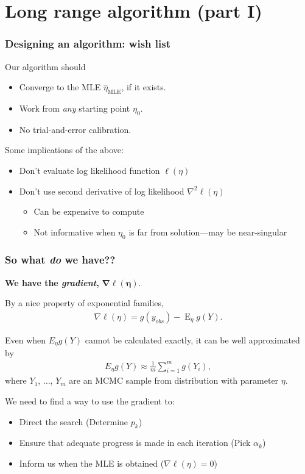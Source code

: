 \documentclass[slidestop,compress, 10pt]{beamer}
\DeclareMathOperator{\E}{E}
\newcommand{\etaMLE}{\hat{\eta}_{\textrm{MLE}}}
\begin{document}
\section{Long range algorithm (part I)}
\frame
{
\frametitle{Designing an algorithm: wish list}

Our algorithm should
\begin{itemize}
\item Converge to the MLE $\etaMLE$, if it exists.
\item Work from \emph{any} starting point $\eta_0$.
\item No trial-and-error calibration.
\end{itemize}
\vspace{2mm}

Some implications of the above:
\begin{itemize}
\item Don't evaluate log likelihood function $\ell( \eta)$
\item Don't use second derivative of log likelihood $\nabla^2 \ell( \eta)$
\begin{itemize}
	\item Can be expensive to compute
	\item Not informative when $\eta_0$ is far from solution---may be near-singular
\end{itemize}
\end{itemize}
}

\frame
{
\frametitle{So what \emph{do} we have??}
{\textbf{We have the \emph{gradient},} $\boldsymbol{\nabla \ell(\eta)}$.}
\vspace*{2mm}

By a nice property of exponential families,
\begin{align*}
	\nabla \ell( \eta ) = g(y_{obs}) - \E_{\eta} g(Y).
\end{align*}


Even when $E_\eta g(Y)$ cannot be calculated exactly, it can be well approximated by
\begin{align*}
E_\eta g(Y) \approx \frac{1}{m}\sum_{i = 1}^m g(Y_i),
\end{align*}
where $Y_1$, $\ldots$, $Y_m$ are an MCMC sample from distribution with parameter $\eta$.
\vspace*{4mm}

We need to find a way to use the gradient to: 
\vspace*{2mm}
\begin{itemize}
\item Direct the search  (Determine $p_k$)
\vspace*{2mm}

\item Ensure that adequate progress is made in each iteration  (Pick $\alpha_k$)
\vspace*{2mm}

\item Inform us when the MLE is obtained  ($\nabla \ell(\eta) = 0$)
\end{itemize}

}
\end{document}

